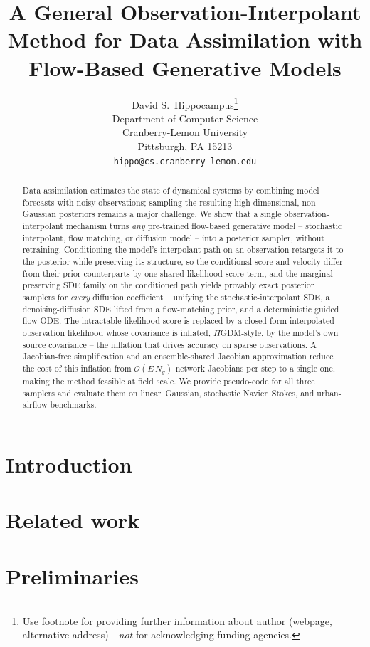 \documentclass{article} %
\title{A General Observation-Interpolant Method for Data Assimilation with Flow-Based Generative Models}
\author{%
  David S.~Hippocampus\thanks{Use footnote for providing further information
    about author (webpage, alternative address)---\emph{not} for acknowledging
    funding agencies.} \\
  Department of Computer Science\\
  Cranberry-Lemon University\\
  Pittsburgh, PA 15213 \\
  \texttt{hippo@cs.cranberry-lemon.edu} \\
}
\theoremstyle{plain}
\theoremstyle{definition}
\theoremstyle{remark}
\begin{document}
\maketitle


\begin{abstract}
Data assimilation estimates the state of dynamical systems by combining model forecasts with noisy observations; sampling the resulting high-dimensional, non-Gaussian posteriors remains a major challenge. We show that a single observation-interpolant mechanism turns \emph{any} pre-trained flow-based generative model -- stochastic interpolant, flow matching, or diffusion model -- into a posterior sampler, without retraining. Conditioning the model's interpolant path on an observation retargets it to the posterior while preserving its structure, so the conditional score and velocity differ from their prior counterparts by one shared likelihood-score term, and the marginal-preserving SDE family on the conditioned path yields provably exact posterior samplers for \emph{every} diffusion coefficient -- unifying the stochastic-interpolant SDE, a denoising-diffusion SDE lifted from a flow-matching prior, and a deterministic guided flow ODE. The intractable likelihood score is replaced by a closed-form interpolated-observation likelihood whose covariance is inflated, $\Pi$GDM-style, by the model's own source covariance -- the inflation that drives accuracy on sparse observations. A Jacobian-free simplification and an ensemble-shared Jacobian approximation reduce the cost of this inflation from $\mathcal{O}(E\,N_y)$ network Jacobians per step to a single one, making the method feasible at field scale. We provide pseudo-code for all three samplers and evaluate them on linear--Gaussian, stochastic Navier--Stokes, and urban-airflow benchmarks.
\end{abstract}


\section{Introduction}\label{sec:introduction}


\section{Related work}\label{sec:related_work}


\section{Preliminaries}\label{sec:preliminaries}

\end{document}
